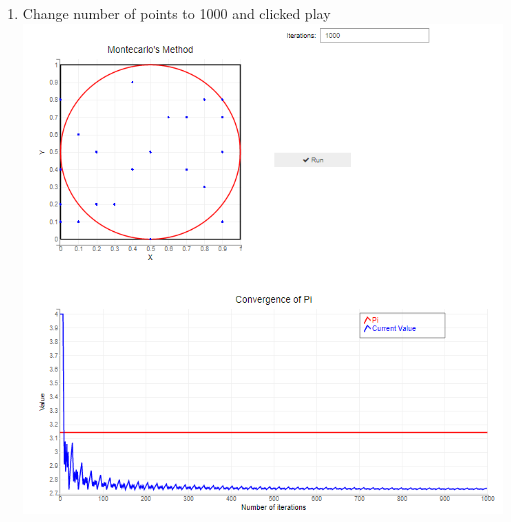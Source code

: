 \begin{enumerate}
    \item Change number of points to 1000 and clicked play\\
    \includegraphics[scale=0.7]{Include/Images/Thesis/Documentation/Visualizers/Randomness/Example 2/Example 2 - 02 - 1000 points played.png}

\end{enumerate}